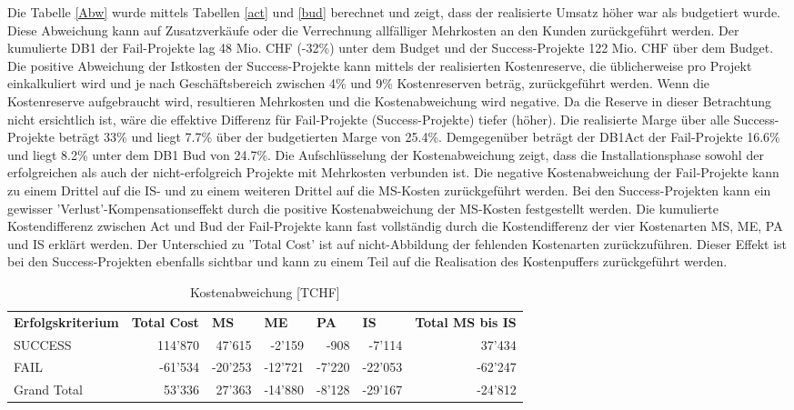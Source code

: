 Die Tabelle \ref{Abw} wurde mittels Tabellen \ref{act} und \ref{bud} berechnet und zeigt, dass der realisierte Umsatz höher war als budgetiert wurde. Diese Abweichung kann auf Zusatzverkäufe oder die Verrechnung allfälliger Mehrkosten an den Kunden zurückgeführt werden. Der kumulierte DB1 der Fail-Projekte lag 48 Mio. CHF (-32\%) unter dem Budget und der Success-Projekte 122 Mio. CHF über dem Budget. Die positive Abweichung der Istkosten der Success-Projekte kann mittels der realisierten Kostenreserve, die üblicherweise pro Projekt einkalkuliert wird und je nach Geschäftsbereich zwischen 4\% und 9\% Kostenreserven beträg, zurückgeführt werden. Wenn die Kostenreserve aufgebraucht wird, resultieren Mehrkosten und die Kostenabweichung wird negative. Da die Reserve in dieser Betrachtung nicht ersichtlich ist, wäre die effektive Differenz für Fail-Projekte (Success-Projekte) tiefer (höher). Die realisierte Marge über alle Success-Projekte beträgt 33\% und liegt 7.7\% über der budgetierten Marge von 25.4\%. Demgegenüber beträgt der DB1Act der Fail-Projekte 16.6\% und liegt 8.2\% unter dem DB1 Bud von 24.7\%.
\newline
Die Aufschlüsselung der Kostenabweichung zeigt, dass die Installationsphase sowohl der erfolgreichen als auch der nicht-erfolgreich Projekte mit Mehrkosten verbunden ist. Die negative Kostenabweichung der Fail-Projekte kann zu einem Drittel auf die IS- und zu einem weiteren Drittel auf die MS-Kosten zurückgeführt werden. Bei den Success-Projekten kann ein gewisser 'Verlust'-Kompensationseffekt durch die positive Kostenabweichung der MS-Kosten festgestellt werden. Die kumulierte Kostendifferenz zwischen Act und Bud der Fail-Projekte kann fast vollständig durch die Kostendifferenz der vier Kostenarten MS, ME, PA und IS erklärt werden. Der Unterschied zu 'Total Cost' ist auf nicht-Abbildung der fehlenden Kostenarten zurückzuführen. Dieser Effekt ist bei den Success-Projekten ebenfalls sichtbar und kann zu einem Teil auf die Realisation des Kostenpuffers zurückgeführt werden.
\begin{table}[H]
	\centering
	\caption{Kostenabweichung [TCHF]}
	\begin{tabular}{lrrrrrr}
		\textbf{Erfolgskriterium} & \multicolumn{1}{l}{\textbf{Total Cost}} & \multicolumn{1}{l}{\textbf{MS}} & \multicolumn{1}{l}{\textbf{ME}} & \multicolumn{1}{l}{\textbf{PA}} & \multicolumn{1}{l}{\textbf{IS}} & \multicolumn{1}{l}{\textbf{Total MS bis IS}} \\
		SUCCESS & 114'870 & 47'615 & -2'159 & -908  & -7'114 & 37'434 \\
		FAIL  & -61'534 & -20'253 & -12'721 & -7'220 & -22'053 & -62'247 \\
		Grand Total & 53'336 & 27'363 & -14'880 & -8'128 & -29'167 & -24'812 \\
	\end{tabular}%
	\label{tab:addlabel}%
\end{table}%
